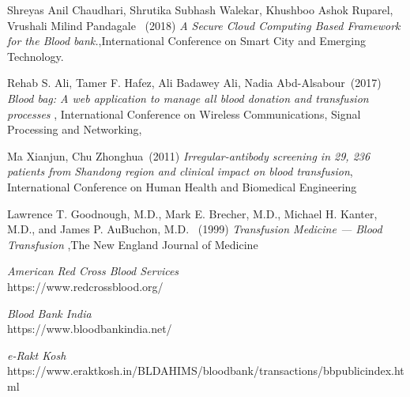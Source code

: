 \begin{thebibliography}{999}

Shreyas Anil Chaudhari, Shrutika Subhash Walekar, Khushboo Ashok Ruparel, Vrushali Milind Pandagale
~(2018)
{\it A Secure Cloud Computing Based Framework
for the Blood bank.},International Conference on Smart City and Emerging Technology.

Rehab S. Ali, Tamer F. Hafez, Ali Badawey Ali, Nadia Abd-Alsabour~(2017)
{\it Blood bag: A web application to manage all blood donation and transfusion processes
}, International Conference on Wireless Communications, Signal Processing and Networking,

Ma Xianjun, Chu Zhonghua~(2011)
{\it Irregular-antibody screening in 29, 236 patients from Shandong region and clinical impact on blood transfusion}, International Conference on Human Health and Biomedical Engineering

Lawrence T. Goodnough, M.D., Mark E. Brecher, M.D., Michael H. Kanter, M.D., and James P. AuBuchon, M.D. ~(1999)
{\it Transfusion Medicine — Blood Transfusion
},The New England Journal of Medicine


{\it American Red Cross Blood Services}\\ https://www.redcrossblood.org/

{\it Blood Bank India}\\ https://www.bloodbankindia.net/

{\it e-Rakt Kosh}\\ https://www.eraktkosh.in/BLDAHIMS/bloodbank/transactions/bbpublicindex.html

\end{thebibliography}




